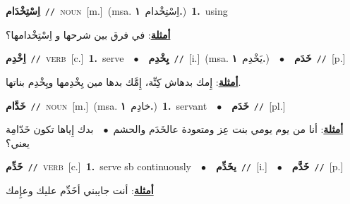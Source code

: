 \documentclass[10pt,a4paper,twoside]{article} %
\begin{document}
\begin{multicols}{2}
{{{{{{{{{{\setlength\topsep{0pt}\textbf{\foreignlanguage{arabic}{اِسْتِخْدَام}}\ {\color{gray}\texttt{//}\color{black}}\ \textsc{noun}\ [m.]\ \color{gray}(msa. \foreignlanguage{arabic}{اِسْتِخْدام}~\foreignlanguage{arabic}{\textbf{١.}})\color{black}\ \textbf{1.}~using\  \begin{flushright}\color{gray}\foreignlanguage{arabic}{\textbf{\underline{\foreignlanguage{arabic}{أمثلة}}}: في فرق بين شرحها و اِسْتِخْدامها؟}\end{flushright}\color{black}} \vspace{2mm}

{\setlength\topsep{0pt}\textbf{\foreignlanguage{arabic}{اِخْدِم}}\ {\color{gray}\texttt{//}\color{black}}\ \textsc{verb}\ [c.]\ \textbf{1.}~serve\ \ $\bullet$\ \ \setlength\topsep{0pt}\textbf{\foreignlanguage{arabic}{يِخْدِم}}\ {\color{gray}\texttt{//}\color{black}}\ [i.]\ \color{gray}(msa. \foreignlanguage{arabic}{يَخْدِم}~\foreignlanguage{arabic}{\textbf{١.}})\color{black}\ \ $\bullet$\ \ \setlength\topsep{0pt}\textbf{\foreignlanguage{arabic}{خَدَم}}\ {\color{gray}\texttt{//}\color{black}}\ [p.]\  \begin{flushright}\color{gray}\foreignlanguage{arabic}{\textbf{\underline{\foreignlanguage{arabic}{أمثلة}}}: إِمك بدهاش كِنِّة، إِمَّك بدها مين يِخْدِمها ويِخْدِم بناتها.}\end{flushright}\color{black}} \vspace{2mm}

{\setlength\topsep{0pt}\textbf{\foreignlanguage{arabic}{خَدَّام}}\ {\color{gray}\texttt{//}\color{black}}\ \textsc{noun}\ [m.]\ \color{gray}(msa. \foreignlanguage{arabic}{خادِم}~\foreignlanguage{arabic}{\textbf{١.}})\color{black}\ \textbf{1.}~servant\ \ $\bullet$\ \ \setlength\topsep{0pt}\textbf{\foreignlanguage{arabic}{خَدَم}}\ {\color{gray}\texttt{//}\color{black}}\ [pl.]\  \begin{flushright}\color{gray}\foreignlanguage{arabic}{\textbf{\underline{\foreignlanguage{arabic}{أمثلة}}}: أنا من يوم يومي بنت عِز ومتعودة عالخَدَم والحشم\ $\bullet$\ \  بدك إِياها تكون خَدّامِة يعني؟}\end{flushright}\color{black}} \vspace{2mm}

{\setlength\topsep{0pt}\textbf{\foreignlanguage{arabic}{خَدِّم}}\ {\color{gray}\texttt{//}\color{black}}\ \textsc{verb}\ [c.]\ \textbf{1.}~serve sb continuously\ \ $\bullet$\ \ \setlength\topsep{0pt}\textbf{\foreignlanguage{arabic}{يخَدِّم}}\ {\color{gray}\texttt{//}\color{black}}\ [i.]\ \ $\bullet$\ \ \setlength\topsep{0pt}\textbf{\foreignlanguage{arabic}{خَدَّم}}\ {\color{gray}\texttt{//}\color{black}}\ [p.]\  \begin{flushright}\color{gray}\foreignlanguage{arabic}{\textbf{\underline{\foreignlanguage{arabic}{أمثلة}}}: أنت جايبني أخَدِّم عليك وعإِمك}\end{flushright}\color{black}} \vspace{2mm}

}}}}}}}}}
\end{multicols}
\end{document}
